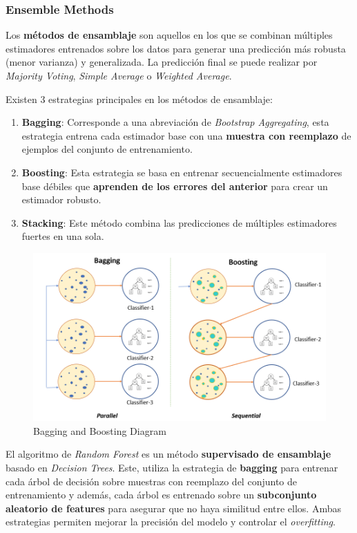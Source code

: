 \subsubsection{Ensemble Methods}

Los \textbf{métodos de ensamblaje} son aquellos en los que se combinan múltiples estimadores entrenados sobre los datos para generar una predicción más robusta (menor varianza) y generalizada. La predicción final se puede realizar por \textit{Majority Voting}, \textit{Simple Average} o \textit{Weighted Average}.

Existen 3 estrategias principales en los métodos de ensamblaje: 
\begin{enumerate}
    \item \textbf{Bagging}: Corresponde a una abreviación de \textit{Bootstrap Aggregating}, esta estrategia entrena cada estimador base con una \textbf{muestra con reemplazo} de ejemplos del conjunto de entrenamiento. 
    \item \textbf{Boosting}: Esta estrategia se basa en entrenar secuencialmente estimadores base débiles que \textbf{aprenden de los errores del anterior} para crear un estimador robusto.
    \item \textbf{Stacking}: Este método combina las predicciones de múltiples estimadores fuertes en una sola. 
\end{enumerate}

\begin{figure}[H]
    \center
    \includegraphics[scale=0.25]{notebooks/ML/img/bagging_and_boosting_diagram.png}
    \caption{Bagging and Boosting Diagram}
\end{figure}


El algoritmo de \textit{Random Forest} es un método \textbf{supervisado de ensamblaje} basado en \textit{Decision Trees}. Este, utiliza la estrategia de \textbf{bagging} para entrenar cada árbol de decisión sobre muestras con reemplazo del conjunto de entrenamiento y además, cada árbol es entrenado sobre un \textbf{subconjunto aleatorio de features} para asegurar que no haya similitud entre ellos. Ambas estrategias permiten mejorar la precisión del modelo y controlar el  \textit{overfitting}.

